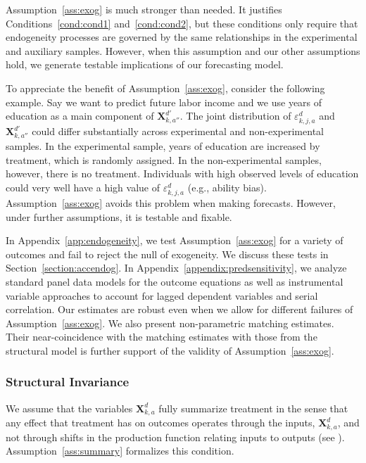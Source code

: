 Assumption~\ref{ass:exog} is much stronger than needed. It justifies Conditions~\ref{cond:cond1} and~\ref{cond:cond2}, but these conditions only require that endogeneity processes are governed by the same relationships in the experimental and auxiliary samples. However, when this assumption and our other assumptions hold, we generate testable implications of our forecasting model.

To appreciate the benefit of Assumption~\ref{ass:exog}, consider the following example. Say we want to predict future labor income and we use years of education as a main component of $\bm{X}_{k,{a''}}^{d'}$. The joint distribution of $\varepsilon_{k,j,a}^d$ and $\bm{X}_{k,{a''}}^{d'}$ could differ substantially across experimental and non-experimental samples. In the experimental sample, years of education are increased by treatment, which is randomly assigned. In the non-experimental samples, however, there is no treatment. Individuals with high observed levels of education could very well have a high value of  $\varepsilon_{k,j,a}^d$ (e.g., ability bias). Assumption~\ref{ass:exog} avoids this problem when making forecasts. However, under further assumptions, it is testable and fixable.

In Appendix~\ref{app:endogeneity}, we test Assumption~\ref{ass:exog} for a variety of outcomes and fail to reject the null of exogeneity. We discuss these tests in Section~\ref{section:accendog}. In Appendix~\ref{appendix:predsensitivity}, we analyze standard panel data models for the outcome equations as well as instrumental variable approaches to account for lagged dependent variables and serial correlation. Our estimates are robust even when we allow for different failures of Assumption~\ref{ass:exog}. We also present non-parametric matching estimates. Their near-coincidence with the matching estimates with those from the structural model is further support of the validity of Assumption~\ref{ass:exog}.

\subsubsection{Structural Invariance}
\label{sec:structural-invariance}

We assume that the variables $\bm{X}_{k,a}^d$ fully summarize treatment in the sense that any effect that treatment has on outcomes operates through the inputs, $\bm{X}_{k,a}^d$, and not through shifts in the production function relating inputs to outputs (see \citealp{Heckman_Pinto_etal_2013_PerryFactor}). Assumption~\ref{ass:summary} formalizes this condition.

